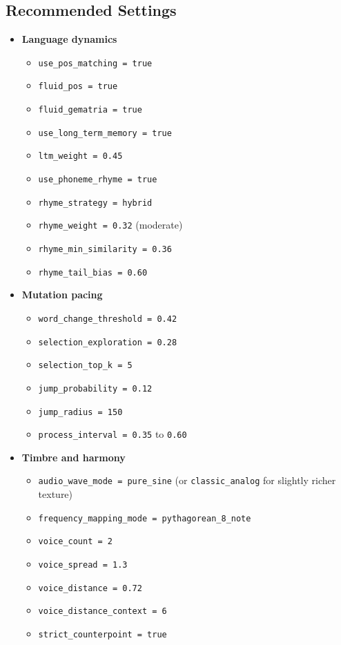 \documentclass[11pt,a4paper]{article}
\begin{document}
\subsection*{Recommended Settings}
\begin{itemize}
  \item \textbf{Language dynamics}
  \begin{itemize}
    \item \texttt{use\_pos\_matching = true}
    \item \texttt{fluid\_pos = true}
    \item \texttt{fluid\_gematria = true}
    \item \texttt{use\_long\_term\_memory = true}
    \item \texttt{ltm\_weight = 0.45}
    \item \texttt{use\_phoneme\_rhyme = true}
    \item \texttt{rhyme\_strategy = hybrid}
    \item \texttt{rhyme\_weight = 0.32} (moderate)
    \item \texttt{rhyme\_min\_similarity = 0.36}
    \item \texttt{rhyme\_tail\_bias = 0.60}
  \end{itemize}

  \item \textbf{Mutation pacing}
  \begin{itemize}
    \item \texttt{word\_change\_threshold = 0.42}
    \item \texttt{selection\_exploration = 0.28}
    \item \texttt{selection\_top\_k = 5}
    \item \texttt{jump\_probability = 0.12}
    \item \texttt{jump\_radius = 150}
    \item \texttt{process\_interval = 0.35} to \texttt{0.60}
  \end{itemize}

  \item \textbf{Timbre and harmony}
  \begin{itemize}
    \item \texttt{audio\_wave\_mode = pure\_sine} (or \texttt{classic\_analog} for slightly richer texture)
    \item \texttt{frequency\_mapping\_mode = pythagorean\_8\_note}
    \item \texttt{voice\_count = 2}
    \item \texttt{voice\_spread = 1.3}
    \item \texttt{voice\_distance = 0.72}
    \item \texttt{voice\_distance\_context = 6}
    \item \texttt{strict\_counterpoint = true}
  \end{itemize}


\end{itemize}
\end{document}
